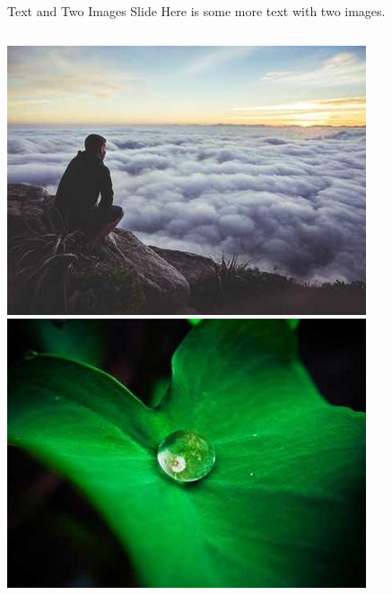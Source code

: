 \documentclass[aspectratio=169, notes]{beamer}
\begin{document}
\begin{frame}{Text and Two Images Slide}
    Here is some more text with two images.
    \begin{columns}
        \includegraphics[width=\textwidth]{Images/image1.jpg}
        \includegraphics[width=\textwidth]{Images/image2.jpg}
    \end{columns}
\end{frame}
\end{document}
